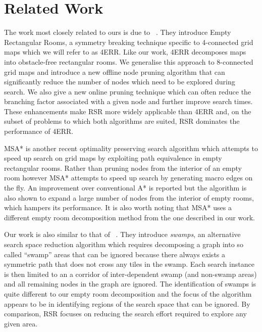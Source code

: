 \section{Related Work}
The work most closely related to ours is due to
\citeauthor{harabor10}~. They introduce Empty Rectangular Rooms, 
a symmetry breaking technique specific to 4-connected grid maps
which we will refer to as 4ERR.
Like our work, 4ERR decomposes maps into obstacle-free rectangular rooms.
We generalise this approach to 8-connected grid maps and introduce a new 
offline node pruning algorithm that can significantly 
reduce the number of nodes which need to be explored during search.
We also give a new online pruning technique which can often reduce the
branching factor associated with a given node and further improve search times.
These enhancements make RSR more widely applicable than 4ERR and, 
on the subset of problems to which both algorithms are suited, 
RSR dominates the performance of 4ERR. 
\par
MSA* \cite{bolanca09} is another recent optimality preserving search algorithm which attempts to speed up search 
on grid maps by exploiting path equivalence in empty rectangular rooms. 
Rather than pruning nodes from the interior of an empty room however MSA* attempts to speed up 
search by generating macro edges on the fly.
An improvement over conventional A* is reported but the algorithm is also
shown to expand a large number of nodes from the interior of empty rooms, which hampers its performance.
It is also worth noting that MSA* uses a different empty room decomposition method
from the one described in our work.
\par
Our work is also similar to that of \citeauthor{pochter10}~. 
They introduce \emph{swamps}, an alternative search space reduction algorithm
which requires decomposing a graph into so called ``swamp'' areas that can be 
ignored because there always exists a symmetric path that does not cross any 
tiles in the swamp. 
Each search instance is then limited to an a corridor of inter-dependent 
swamp (and non-swamp areas) and all remaining nodes in the graph are ignored.
The identification of swamps is quite different to our empty room decomposition
and the focus of the algorithm appears to be in identifying regions of the
search space that can be ignored.
By comparison, RSR focuses on reducing the search effort required to explore
any given area.
